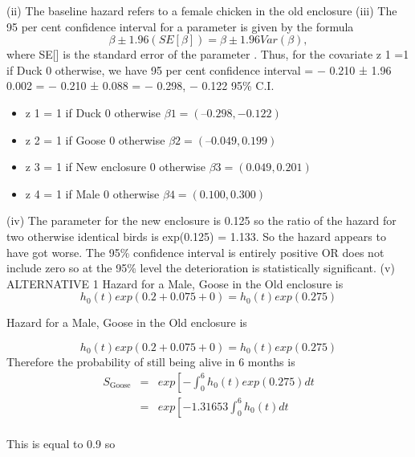 \documentclass[a4paper,12pt]{article}
\begin{document}
(ii) The baseline hazard refers to a female chicken in the old enclosure
(iii) The 95 per cent confidence interval for a parameter \beta is given by
the formula
\[\beta \pm 1.96(SE[ \beta ]) = \beta \pm 1.96 Var ( \beta ) ,\]
where SE[\beta] is the standard error of the parameter \beta.
Thus, for the covariate z 1 =1 if Duck 0 otherwise, we have
95 per cent confidence interval =
− 0.210 ± 1.96 0.002 = − 0.210 ± 0.088 = { − 0.298, − 0.122}
95\% C.I.
\begin{itemize}
\item z 1 = 1 if Duck 0 otherwise $\beta 1 = (–0.298, -0.122)$
\item z 2 = 1 if Goose 0 otherwise $\beta 2 = (–0.049, 0.199)$
\item z 3 = 1 if New enclosure 0 otherwise $\beta 3 = (0.049, 0.201)$
\item z 4 = 1 if Male 0 otherwise $\beta 4 = (0.100, 0.300)$
\end{itemize}
(iv)
The parameter for the new enclosure is 0.125 so the ratio of the hazard for two otherwise identical birds is
exp(0.125) = 1.133.
So the hazard appears to have got worse.
The 95\% confidence interval is entirely positive OR does not include zero
so at the 95\% level the deterioration is statistically significant.
(v)
ALTERNATIVE 1
Hazard for a Male, Goose in the Old enclosure is
\[h_0 ( t ) exp (0.2 + 0.075 + 0) = h_0 ( t ) exp (0.275)\]

Hazard for a Male, Goose in the Old enclosure is

\[h_0 (t) exp(0.2 + 0.075 + 0) = h_0 (t) exp(0.275)\]
Therefore the probability of still being alive in 6 months is
\begin{eqnarray*}
S_{\mbox{Goose}}
&=& exp \left[-\int^{6}_{0} h_{0}(t) exp(0.275) dt \\
&=& exp \left[-1.31653\int^{6}_{0} h_{0}(t) dt \\
\end{eqnarray*}

This is equal to 0.9 so
\end{document}
